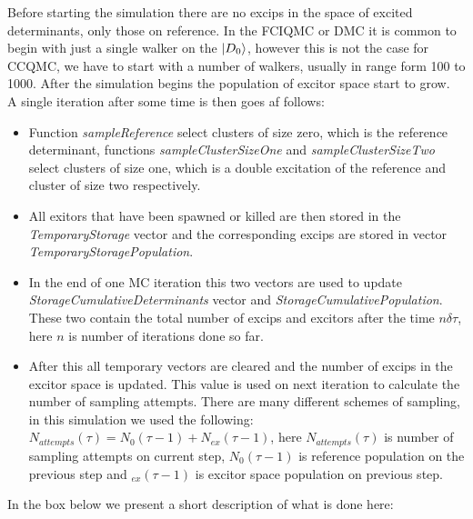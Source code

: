 \documentclass[twoside,english]{uiofysmaster}
\theoremstyle{definition}
\begin{document}
Before starting the simulation there are no excips in the space of excited determinants, only those on reference. In the FCIQMC or DMC it is common to begin with just a single walker on the $\ket{D_0}$, however this is not the case for CCQMC, we have to start with a number of walkers, usually in range form 100 to 1000. After the simulation begins the population of excitor space start to grow. \\ 

A single iteration after some time is then goes af follows:
\begin{itemize}
\item Function \textit{sampleReference} select clusters of size zero, which is the reference determinant, functions \textit{sampleClusterSizeOne} and \textit{sampleClusterSizeTwo} select clusters of size one, which is a double excitation of the reference and cluster of size two respectively. 
\item All exitors that have been spawned or killed are then stored in the \textit{TemporaryStorage} vector and the corresponding excips are stored in vector \textit{TemporaryStoragePopulation}.
\item In the end of one MC iteration this two vectors are used to update \textit{StorageCumulativeDeterminants} vector and \textit{StorageCumulativePopulation}. These two contain the total number of excips and excitors after the time $n \delta\tau$, here $n$ is number of iterations done so far. 
\item After this all temporary vectors are cleared and the number of excips in the excitor space is updated. This value is used on next iteration to calculate the number of sampling attempts. There are many different schemes of sampling, in this simulation we used the following: $N_{attempts}(\tau)= N_0(\tau-1)+N_{ex}(\tau-1)$, here $N_{attempts}(\tau)$ is number of sampling attempts on current step, $N_0(\tau-1)$ is reference population on the previous step and $_{ex}(\tau-1)$ is excitor space population on previous step.
\end{itemize}
In the box below we present a short description of what is done here:
\end{document}
